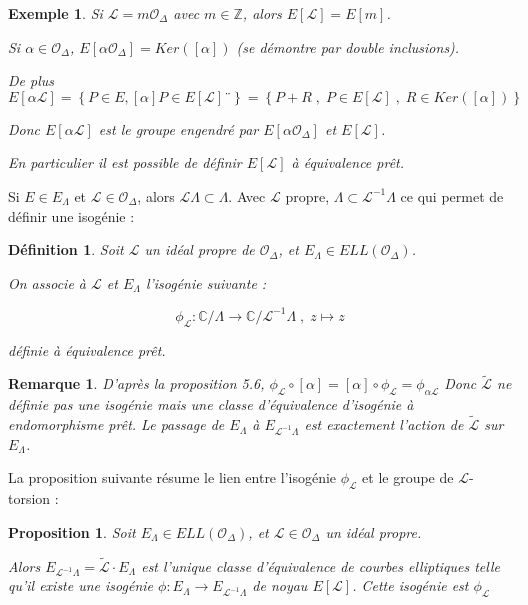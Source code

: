 \documentclass{article}
\newcommand{\Z}[0]{\mathbb{Z}}
\newcommand{\C}[0]{\mathbb{C}}
\newcommand{\OR}[0]{\mathcal{O}}
\newcommand{\LR}[0]{\mathcal{L}}
\newcommand{\CL}[0]{\tilde{\LR}}
\newtheorem{Prop}[The]{Proposition}
\newtheorem{Def}[The]{Définition}
\newtheorem{Rem}[The]{Remarque}
\newtheorem{Ex}[The]{Exemple}
\begin{document}
\begin{Ex}
	
	Si $\LR = m\OR_{\Delta}$ avec $m\in\Z$, alors $E\left[ \LR\right] = E\left[ m\right] $.
	
	Si $\alpha\in\OR_{\Delta}$, $E[\alpha\OR_{\Delta}] = Ker([\alpha])$ (se démontre par double inclusions).
	
	De plus $E\left[ \alpha\LR\right] = \left\lbrace P\in E, [\alpha]P\in E\left[ \LR\right]¨\right\rbrace = \left\lbrace P + R \; , \; P\in E\left[ \LR\right] \; , \; R\in Ker\left( \left[ \alpha \right] \right) \right\rbrace $
	
	Donc $E\left[ \alpha\LR\right]$ est le groupe engendré par $E[\alpha\OR_{\Delta}]$ et $E\left[ \LR\right]$.
	
	En particulier il est possible de définir $E\left[ \LR\right]$ à équivalence prêt. 
	
\end{Ex}

Si $E\in E_{\Lambda}$ et $\LR\in\OR_{\Delta}$, alors $\LR\Lambda\subset\Lambda$. Avec $\LR$ propre, $\Lambda\subset\LR^{-1}\Lambda$ ce qui permet de définir une isogénie :

\begin{Def}
	
	Soit $\LR$ un idéal propre de $\OR_{\Delta}$, et $E_{\Lambda}\in ELL(\OR_{\Delta})$.
	
	On associe à $\LR$ et $E_{\Lambda}$ l'isogénie suivante :
	
	\begin{equation*}
		\phi_{\LR} : \C/\Lambda\rightarrow\C/\LR^{-1}\Lambda\; , \; z\mapsto z
	\end{equation*}
	
	définie à équivalence prêt. 
	
\end{Def}

\begin{Rem}
	D'après la proposition 5.6, $\phi_{\LR}\circ[\alpha] = [\alpha]\circ\phi_{\LR} = \phi_{\alpha\LR}$
	Donc $\CL$ ne définie pas une isogénie mais une classe d'équivalence d'isogénie à endomorphisme prêt. 
	Le passage de $E_{\Lambda}$ à $E_{\LR^{-1}\Lambda}$ est exactement l'action de $\CL$ sur $E_{\Lambda}$.
\end{Rem}

La proposition suivante résume le lien entre l'isogénie $\phi_{\LR}$ et le groupe de $\LR$-torsion :

\begin{Prop}
	
	Soit $E_{\Lambda}\in ELL(\OR_{\Delta})$, et $\LR\in\OR_{\Delta}$ un idéal propre. 
	
	Alors $E_{\LR^{-1}\Lambda} = \CL\cdot E_{\Lambda}$ est l'unique classe d'équivalence de courbes elliptiques telle qu'il existe une isogénie $\phi : E_{\Lambda}\rightarrow E_{\LR^{-1}\Lambda}$ de noyau $E\left[ \LR\right]$. Cette isogénie est $\phi_{\LR}$
	
\end{Prop}
\end{document}
